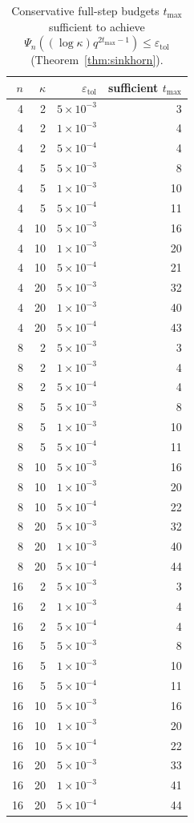 \documentclass[11pt]{article}
\numberwithin{equation}{section}
\theoremstyle{plain}
\theoremstyle{definition}
\theoremstyle{remark}
\newcommand{\epstol}{\varepsilon_{\mathrm{tol}}}
\begin{document}
\begin{table}[tbp]
\centering
\small
\caption{Conservative full-step budgets $t_{\max}$ sufficient to achieve $\Psi_n\!\left((\log\kappa)q^{2t_{\max}-1}\right)\le \epstol$ (Theorem~\ref{thm:sinkhorn}).}
\label{tab:tmax_lookup}
\begin{tabular}{rrrr}
\toprule
$n$ & $\kappa$ & $\epstol$ & sufficient $t_{\max}$ \\
\midrule
4 & 2 &\(5\times 10^{-3}\) & 3 \\
4 & 2 &\(1\times 10^{-3}\) & 4 \\
4 & 2 &\(5\times 10^{-4}\) & 4 \\
4 & 5 &\(5\times 10^{-3}\) & 8 \\
4 & 5 &\(1\times 10^{-3}\) & 10 \\
4 & 5 &\(5\times 10^{-4}\) & 11 \\
4 & 10 &\(5\times 10^{-3}\) & 16 \\
4 & 10 &\(1\times 10^{-3}\) & 20 \\
4 & 10 &\(5\times 10^{-4}\) & 21 \\
4 & 20 &\(5\times 10^{-3}\) & 32 \\
4 & 20 &\(1\times 10^{-3}\) & 40 \\
4 & 20 &\(5\times 10^{-4}\) & 43 \\
8 & 2 &\(5\times 10^{-3}\) & 3 \\
8 & 2 &\(1\times 10^{-3}\) & 4 \\
8 & 2 &\(5\times 10^{-4}\) & 4 \\
8 & 5 &\(5\times 10^{-3}\) & 8 \\
8 & 5 &\(1\times 10^{-3}\) & 10 \\
8 & 5 &\(5\times 10^{-4}\) & 11 \\
8 & 10 &\(5\times 10^{-3}\) & 16 \\
8 & 10 &\(1\times 10^{-3}\) & 20 \\
8 & 10 &\(5\times 10^{-4}\) & 22 \\
8 & 20 &\(5\times 10^{-3}\) & 32 \\
8 & 20 &\(1\times 10^{-3}\) & 40 \\
8 & 20 &\(5\times 10^{-4}\) & 44 \\
16 & 2 &\(5\times 10^{-3}\) & 3 \\
16 & 2 &\(1\times 10^{-3}\) & 4 \\
16 & 2 &\(5\times 10^{-4}\) & 4 \\
16 & 5 &\(5\times 10^{-3}\) & 8 \\
16 & 5 &\(1\times 10^{-3}\) & 10 \\
16 & 5 &\(5\times 10^{-4}\) & 11 \\
16 & 10 &\(5\times 10^{-3}\) & 16 \\
16 & 10 &\(1\times 10^{-3}\) & 20 \\
16 & 10 &\(5\times 10^{-4}\) & 22 \\
16 & 20 &\(5\times 10^{-3}\) & 33 \\
16 & 20 &\(1\times 10^{-3}\) & 41 \\
16 & 20 &\(5\times 10^{-4}\) & 44 \\
\bottomrule
\end{tabular}
\end{table}
\end{document}
